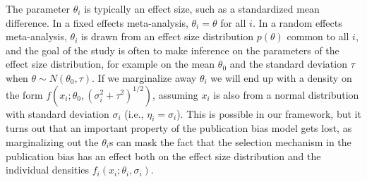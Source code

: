 \documentclass[useAMS,usenatbib,referee]{biom}
\renewcommand{\sqrt}[1]{(#1)^{1/2}}
\providecommand{\DIFaddtex}[1]{{\protect\color{green}\uwave{#1}}} %
\providecommand{\DIFdeltex}[1]{{\protect\color{red}\sout{#1}}}                      %
\providecommand{\DIFaddbegin}{} %
\providecommand{\DIFaddend}{} %
\providecommand{\DIFdelbegin}{} %
\providecommand{\DIFdelend}{} %
\providecommand{\DIFadd}[1]{\texorpdfstring{\DIFaddtex{#1}}{#1}} %
\providecommand{\DIFdel}[1]{\texorpdfstring{\DIFdeltex{#1}}{}} %
\begin{document}
The parameter $\theta_{i}$ is typically an effect size, such as a standardized mean difference. In a fixed effects meta-analysis, $\theta_{i}=\theta$ for all $i$. In a random effects meta-analysis, $\theta_{i}$ is drawn from an effect size distribution $p(\theta)$ common to all $i$, and the goal of the study is often to make inference on the parameters of the effect size distribution, for example on the mean $\theta_{0}$ and the standard deviation $\tau$ when \DIFdelbegin \DIFdel{$\theta \sim N(\theta_{0},\tau)$}\DIFdelend \DIFaddbegin \DIFadd{$\theta_i \sim N(\theta_{0},\tau^2)$}\DIFaddend . If we marginalize away $\theta_{i}$ we will end up with a density on the form \DIFdelbegin \DIFdel{$f(x_{i}; \theta_{0},\sqrt{\sigma_{i}^{2}+\tau^{2}})$}\DIFdelend \DIFaddbegin \DIFadd{$f(x_{i}\mid \theta_{0},\sigma_{i}^{2}+\tau^{2})$}\DIFaddend , assuming $x_{i}$ is also from a normal distribution with standard deviation $\sigma_{i}$ (i.e., $\eta_i = \sigma_i$). This is possible in our framework, but it turns out that an important property of the publication bias model gets lost, as marginalizing out the $\theta_{i}$s can mask the fact that the selection mechanism in the publication bias has an effect both on the effect size distribution and the individual densities \DIFdelbegin \DIFdel{$f_{i}(x_{i};\theta_i, \sigma_i)$}\DIFdelend \DIFaddbegin \DIFadd{$f_{i}(x_{i}\mid\theta_i, \sigma_i)$}\DIFaddend .
\end{document}

